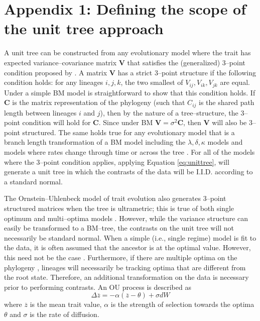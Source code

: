\documentclass[a4paper,11pt]{article}
\begin{document}
\newpage

\section{Appendix 1: Defining the scope of the unit tree approach}

A unit tree can be constructed from any evolutionary model where the trait has expected variance--covariance matrix $\mathbf{V}$ that satisfies the (generalized) 3--point condition proposed by \citet{Ho2014}. A matrix $\mathbf{V}$ has a strict 3--point structure if the following condition holds: for any lineages $i,j,k$, the two smallest of $V_{ij}, V_{ik}, V_{jk}$ are equal. Under a simple BM model is straightforward to show that this condition holds. If $\mathbf{C}$ is the matrix representation of the phylogeny (such that $C_{ij}$ is the shared path length between lineages $i$ and $j$), then by the nature of a tree--structure, the 3--point condition will hold for $\mathbf{C}$. Since under BM $\mathbf{V}=\sigma^2\mathbf{C}$, then $\mathbf{V}$ will also be 3--point structured. The same holds true for any evolutionary model that is a branch length transformation of a BM model including the $\lambda, \delta, \kappa$ models \citep{Pagel1997,Pagel1999} and models where rates change through time \citep[the ACDC or EB model;][]{Blomberg2003, Harmon2010} or across the tree \citep{Omeara2006, Thomas2006, Eastman2011, Revell2011, motmot}. For all of the models where the 3--point condition applies, applying Equation \ref{eq:unittree}, will generate a unit tree in which the contrasts of the data will be I.I.D. according to a standard normal. 

The Ornstein--Uhlenbeck model of trait evolution \citep{Hansen1997, ButlerKing2004} also generates 3--point structured matrices when the tree is ultrametric; this is true of both single optimum and multi--optima models \citep{Ho2014}. However, while the variance structure can easily be transformed to a BM--tree, the contrasts on the unit tree will not necessarily be standard normal. When a simple (i.e., single regime) model is fit to the data, it is often assumed that the ancestor is at the optimal value. However, this need not be the case \citep{HoAne2013}. Furthermore, if there are multiple optima on the phylogeny \citep{ButlerKing2004, IngramMahler2013, Uyedabayou}, lineages will necessarily be tracking optima that are different from the root state. Therefore, an additional transformation on the data is necessary prior to performing contrasts. An OU process is described as 
\[\Delta \overline{z} = -\alpha (\overline{z} - \theta) + \sigma dW\]
where $\overline{z}$ is the mean trait value, $\alpha$ is the strength of selection towards the optima $\theta$ and $\sigma$ is the rate of diffusion.
\end{document}
